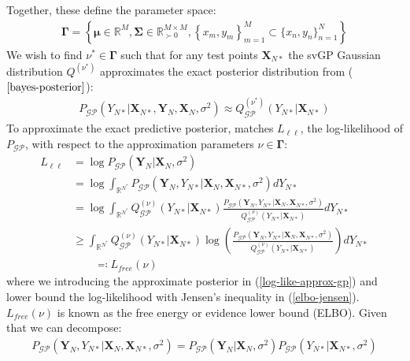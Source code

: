 \documentclass{article}
\newcommand{\GP}{\operatorname{\mathcal{GP}}}
\numberwithin{equation}{section}
\begin{document}
Together, these define the parameter space:
\begin{align}
    \mathbf{\Gamma} = \left\{\boldsymbol{\mu} \in \mathbb{R}^{M}, \mathbf{\Sigma} \in \mathbb{R}^{M\times M}_{\succ 0}, \left\{x_m, y_m\right\}_{m=1}^{M} \subset \{x_n, y_n\}_{n=1}^{N}\right\}
    \label{svgp-parameter-space}
\end{align}
We wish to find $\nu^* \in \mathbf{\Gamma}$ such that for any test points $\mathbf{X}_{N*}$ the svGP Gaussian distribution $Q^{(\nu^*)}$ approximates the exact posterior distribution from ($\ref{bayes-posterior}$):
\begin{align}
    P_{\GP}\left(Y_{N*} \vert \mathbf{X}_{N*}, \mathbf{Y}_N, \mathbf{X}_N, \sigma^2 \right) \approx Q_{\GP}^{(\nu^*)}\left(Y_{N*} \vert \mathbf{X}_{N*}\right)
    \label{svgp-desired-approximation}
\end{align}
To approximate the exact predictive posterior, \cite{titsias2009variational} matches $L_{\ell \ell}$, the log-likelihood of $P_{\GP}$, with respect to the approximation parameters $\nu \in \boldsymbol{\Gamma}$:
\begin{align}
    L_{\ell \ell} &= \log P_{\GP}\left(\mathbf{Y}_N \vert \mathbf{X}_N, \sigma^2\right) \\ 
     \label{log-like}
    &= \log \int_{\mathbb{R}^{N^*}} P_{\GP}\left(\mathbf{Y}_N, Y_{N*} \vert \mathbf{X}_{N}, \mathbf{X}_{N*}, \sigma^2\right) d Y_{N*} \\
     \label{log-like-approx-gp}
&= \log \int_{\mathbb{R}^{N^*}} Q^{(\nu)}_{\GP}\left(Y_{N*} \vert \mathbf{X}_{N*}\right) \frac{P_{\GP}\left(\mathbf{Y}_N, Y_{N*} \vert \mathbf{X}_{N}, \mathbf{X}_{N*}, \sigma^2\right)}{Q^{(\nu)}_{\GP}\left(Y_{N*} \vert \mathbf{X}_{N*}\right)} d Y_{N*}\\
&\geq \int_{\mathbb{R}^{N^*}} Q^{(\nu)}_{\GP}\left(Y_{N*} \vert \mathbf{X}_{N*}\right) \log\left(\frac{P_{\GP}\left(\mathbf{Y}_N, Y_{N*} \vert \mathbf{X}_{N}, \mathbf{X}_{N*}, \sigma^2\right)}{Q^{(\nu)}_{\GP}\left(Y_{N*} \vert \mathbf{X}_{N*}\right)} \right)d Y_{N*}
 \label{elbo-jensen}
 \\ & \qquad \eqqcolon L_{free}(\nu)
 \label{elbo-definition}
\end{align}
where we introducing the approximate posterior in (\ref{log-like-approx-gp}) and lower bound the log-likelihood with Jensen's inequality in (\ref{elbo-jensen}). $L_{free}(\nu)$ is known as the free energy or evidence lower bound (ELBO). Given that we can decompose:
\begin{align}
    P_{\GP}\left(\mathbf{Y}_N, Y_{N*} \vert \mathbf{X}_{N}, \mathbf{X}_{N*}, \sigma^2\right) = P_{\GP} \left(\mathbf{Y}_N \vert \mathbf{X}_{N}, \sigma^2\right) P_{\GP}\left(Y_{N*}\vert \mathbf{X}_{N*}, \sigma^2 \right)
    \label{decomposed-numerator}
\end{align}
\end{document}
